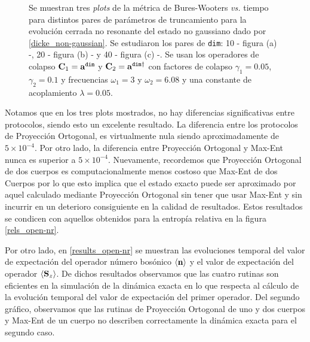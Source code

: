 \documentclass{report} %
\numberwithin{equation}{section}
\begin{document}
\begin{figure}
\caption{Se muestran tres \textit{plots} de la métrica de Bures-Wooters \textit{vs.} tiempo para distintos pares de parámetros de truncamiento para la evolución cerrada no resonante del estado no gaussiano dado por \eqref{dicke_non-gaussian}. Se estudiaron los pares de \texttt{dim}: 10 - figura (a) -, 20 - figura (b) - y 40 - figura (c) -. Se usan los operadores de colapso ${\bf C}_1 = {\bf a}^{\texttt{dim}}$ y ${\bf C}_2 = {\bf a}^{\texttt{dim}\dagger}$ con factores de colapso $\gamma_1 = 0.05$, $\gamma_2 = 0.1$ y frecuencias $\omega_1 = 3$ y $\omega_2 = 6.08$ y una constante de acoplamiento $\lambda = 0.05$.}
\label{dicke_ng}
\end{figure}

Notamos que en los tres plots mostrados, no hay diferencias significativas entre protocolos, siendo esto un excelente resultado. La diferencia entre los protocolos de Proyección Ortogonal, es virtualmente nula siendo aproximadamente de $5\times 10^{-4}$. Por otro lado, la diferencia entre Proyección Ortogonal y Max-Ent nunca es superior a $5\times 10^{-4}$. Nuevamente, recordemos que Proyección Ortogonal de dos cuerpos es computacionalmente menos costoso que Max-Ent de dos Cuerpos por lo que esto implica que el estado exacto puede ser aproximado por aquel calculado mediante Proyección Ortogonal sin tener que usar Max-Ent y sin incurrir en un deterioro consiguiente en la calidad de resultados. Estos resultados se condicen con aquellos obtenidos para la entropía relativa en la figura \ref{rels_open-nr}. 

Por otro lado, en \ref{results_open-nr} se muestran las evoluciones temporal del valor de expectación del operador número bosónico $\langle {\bf n} \rangle $ y el valor de expectación del operador $\langle {\bf S}_z \rangle$. De dichos resultados observamos que las cuatro rutinas son eficientes en la simulación de la dinámica exacta en lo que respecta al cálculo de la evolución temporal del valor de expectación del primer operador. 
Del segundo gráfico, observamos que las rutinas de Proyección Ortogonal de uno y dos cuerpos y  Max-Ent de un cuerpo no describen correctamente la dinámica exacta para el segundo caso.\\
\end{document}
